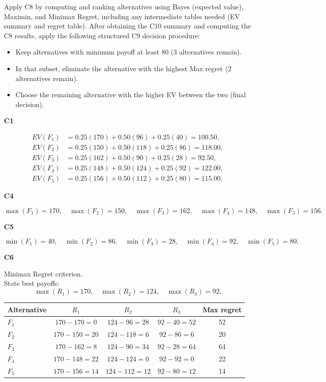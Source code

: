 \begin{ExamProblems}
		Apply C8 by computing and ranking alternatives using Bayes (expected value), Maximin, and Minimax Regret, including any intermediate tables needed (EV summary and regret table).
		After obtaining the C10 summary and computing the C8 results, apply the following structured C9 decision procedure:
		\begin{itemize}
			\item Keep alternatives with minimum payoff at least 80 (3 alternatives remain).
			\item In that subset, eliminate the alternative with the highest Max regret (2 alternatives remain).
			\item Choose the remaining alternative with the higher EV between the two (final decision).
		\end{itemize}
		
		\vspace{0.25cm}
		
		\textbf{C1}\par
				\[
		\begin{aligned}
			EV(F_1)&=0.25(170)+0.50(96)+0.25(40)=100.50,\\
			EV(F_2)&=0.25(150)+0.50(118)+0.25(86)=118.00,\\
			EV(F_3)&=0.25(162)+0.50(90)+0.25(28)=92.50,\\
			EV(F_4)&=0.25(148)+0.50(124)+0.25(92)=122.00,\\
			EV(F_5)&=0.25(156)+0.50(112)+0.25(80)=115.00.
		\end{aligned}
		\]
		

		\textbf{C4}\par
				\[
		\max(F_1)=170,\quad \max(F_2)=150,\quad \max(F_3)=162,\quad \max(F_4)=148,\quad \max(F_5)=156.
		\]
		

		\textbf{C5}\par
				\[
		\min(F_1)=40,\quad \min(F_2)=86,\quad \min(F_3)=28,\quad \min(F_4)=92,\quad \min(F_5)=80.
		\]
		


		\textbf{C6}\par
		Minimax Regret criterion.\\
				State best payoffs:
		\[
		\max(R_1)=170,\quad \max(R_2)=124,\quad \max(R_3)=92.
		\]
		\begin{center}
			\begin{tabular}{l c c c c}
				\toprule
				Alternative & $R_1$ & $R_2$ & $R_3$ & Max regret \\
				\midrule
				$F_1$ & $170-170=0$ & $124-96=28$ & $92-40=52$ & 52 \\
				$F_2$ & $170-150=20$ & $124-118=6$ & $92-86=6$ & 20 \\
				$F_3$ & $170-162=8$ & $124-90=34$ & $92-28=64$ & 64 \\
				$F_4$ & $170-148=22$ & $124-124=0$ & $92-92=0$ & 22 \\
				$F_5$ & $170-156=14$ & $124-112=12$ & $92-80=12$ & 14 \\
				\bottomrule
			\end{tabular}
		\end{center}
		


\end{ExamProblems}
